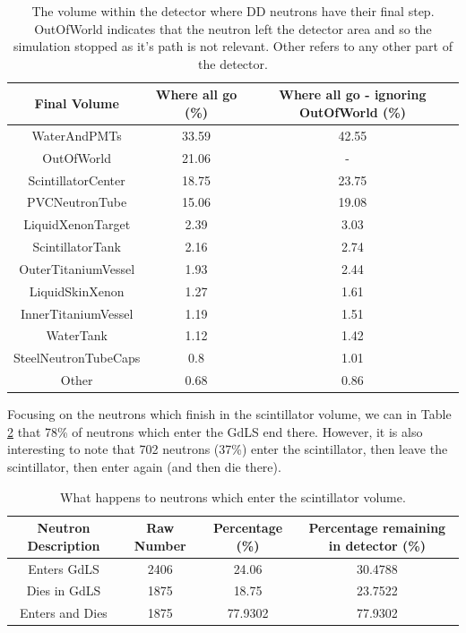 \begin{table}[!htbp]
    \centering
    \begin{tabular}{c | c | c  }
    \hline
    {Final Volume}  & {Where all go (\%)} & {Where all go - ignoring OutOfWorld (\%)} \\ \hline
    WaterAndPMTs & 33.59 & 42.55 \\
    OutOfWorld & 21.06 & - \ \\
    ScintillatorCenter & 18.75 & 23.75 \\
    PVCNeutronTube & 15.06 & 19.08 \\
    LiquidXenonTarget & 2.39 & 3.03 \\
    ScintillatorTank & 2.16 & 2.74 \\
    OuterTitaniumVessel & 1.93 & 2.44 \\
    LiquidSkinXenon & 1.27 & 1.61 \\
    InnerTitaniumVessel & 1.19 & 1.51 \\
    WaterTank & 1.12 & 1.42 \\
    SteelNeutronTubeCaps & 0.8 & 1.01 \\
    Other & 0.68 & 0.86 
    \end{tabular}
    \caption{The volume within the detector where DD neutrons have their final step. OutOfWorld indicates that the neutron left the detector area and so the simulation stopped as it's path is not relevant. Other refers to any other part of the detector.}
    \label{tab:Where_neutrons_go}
\end{table} 

\par
Focusing on the neutrons which finish in the scintillator volume, we can in Table \ref{tab:Where_gdls_neutrons_go} that 78\% of neutrons which enter the GdLS end there.
However, it is also interesting to note that 702 neutrons (37\%) enter the scintillator, then leave the scintillator, then enter again (and then die there).

\begin{table}[!htbp]
    \centering
    \begin{tabular}{c | c | c | c }
    \hline
    {Neutron Description}  & {Raw Number} & {Percentage (\%)} & {Percentage remaining in detector (\%)} \\ \hline
    Enters GdLS            &     2406     & 24.06                           & 30.4788 \\
    Dies in GdLS           &     1875     & 18.75                           & 23.7522 \\
    Enters and Dies        &     1875     & 77.9302                         & 77.9302
    
    \end{tabular}
    \caption{What happens to neutrons which enter the scintillator volume.}
    \label{tab:Where_gdls_neutrons_go}
\end{table} 

